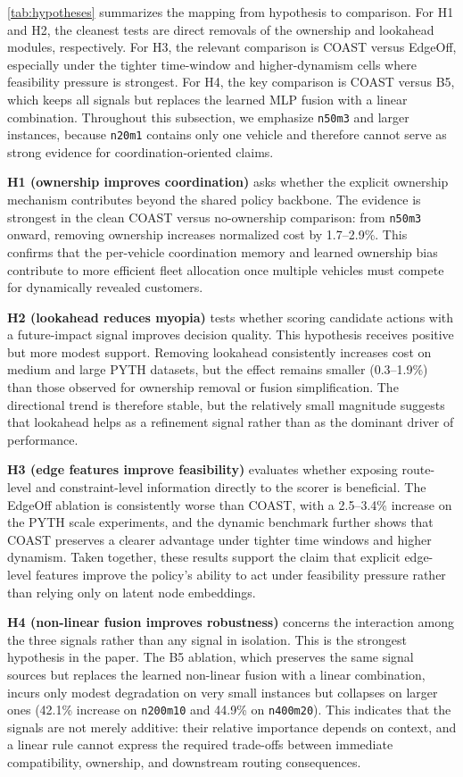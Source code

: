 \documentclass[conference]{IEEEtran}
\begin{document}
\autoref{tab:hypotheses} summarizes the mapping from hypothesis to comparison. For H1 and H2, the cleanest tests are direct removals of the ownership and lookahead modules, respectively. For H3, the relevant comparison is COAST versus EdgeOff, especially under the tighter time-window and higher-dynamism cells where feasibility pressure is strongest. For H4, the key comparison is COAST versus B5, which keeps all signals but replaces the learned MLP fusion with a linear combination. Throughout this subsection, we emphasize \texttt{n50m3} and larger instances, because \texttt{n20m1} contains only one vehicle and therefore cannot serve as strong evidence for coordination-oriented claims.

\textbf{H1 (ownership improves coordination)} asks whether the explicit ownership mechanism contributes beyond the shared policy backbone. The evidence is strongest in the clean COAST versus no-ownership comparison: from \texttt{n50m3} onward, removing ownership increases normalized cost by 1.7--2.9\%. This confirms that the per-vehicle coordination memory and learned ownership bias contribute to more efficient fleet allocation once multiple vehicles must compete for dynamically revealed customers.

\textbf{H2 (lookahead reduces myopia)} tests whether scoring candidate actions with a future-impact signal improves decision quality. This hypothesis receives positive but more modest support. Removing lookahead consistently increases cost on medium and large PYTH datasets, but the effect remains smaller (0.3--1.9\%) than those observed for ownership removal or fusion simplification. The directional trend is therefore stable, but the relatively small magnitude suggests that lookahead helps as a refinement signal rather than as the dominant driver of performance.

\textbf{H3 (edge features improve feasibility)} evaluates whether exposing route-level and constraint-level information directly to the scorer is beneficial. The EdgeOff ablation is consistently worse than COAST, with a 2.5--3.4\% increase on the PYTH scale experiments, and the dynamic benchmark further shows that COAST preserves a clearer advantage under tighter time windows and higher dynamism. Taken together, these results support the claim that explicit edge-level features improve the policy's ability to act under feasibility pressure rather than relying only on latent node embeddings.

\textbf{H4 (non-linear fusion improves robustness)} concerns the interaction among the three signals rather than any signal in isolation. This is the strongest hypothesis in the paper. The B5 ablation, which preserves the same signal sources but replaces the learned non-linear fusion with a linear combination, incurs only modest degradation on very small instances but collapses on larger ones (42.1\% increase on \texttt{n200m10} and 44.9\% on \texttt{n400m20}). This indicates that the signals are not merely additive: their relative importance depends on context, and a linear rule cannot express the required trade-offs between immediate compatibility, ownership, and downstream routing consequences.
\end{document}
